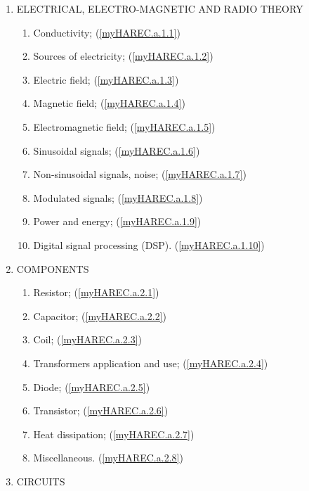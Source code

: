 \renewcommand{\labelenumi}{\theenumi.}
\renewcommand{\theenumii}{\arabic{enumii}}
\renewcommand{\labelenumii}{\theenumi.\theenumii}
\begin{enumerate}
\item ELECTRICAL, ELECTRO-MAGNETIC AND RADIO THEORY
\begin{enumerate}[noitemsep]
\item Conductivity; (\ref{myHAREC.a.1.1})\label{HAREC.a.1.1}
\item Sources of electricity; (\ref{myHAREC.a.1.2})\label{HAREC.a.1.2}
\item Electric field; (\ref{myHAREC.a.1.3})\label{HAREC.a.1.3}
\item Magnetic field; (\ref{myHAREC.a.1.4})\label{HAREC.a.1.4}
\item Electromagnetic field; (\ref{myHAREC.a.1.5})\label{HAREC.a.1.5}
\item Sinusoidal signals; (\ref{myHAREC.a.1.6})\label{HAREC.a.1.6}
\item Non-sinusoidal signals, noise; (\ref{myHAREC.a.1.7})\label{HAREC.a.1.7}
\item Modulated signals; (\ref{myHAREC.a.1.8})\label{HAREC.a.1.8}
\item Power and energy; (\ref{myHAREC.a.1.9})\label{HAREC.a.1.9}
\item Digital signal processing (DSP). (\ref{myHAREC.a.1.10})\label{HAREC.a.1.10}
\end{enumerate}
\item COMPONENTS
\begin{enumerate}[noitemsep]
\item Resistor; (\ref{myHAREC.a.2.1})\label{HAREC.a.2.1}
\item Capacitor; (\ref{myHAREC.a.2.2})\label{HAREC.a.2.2}
\item Coil; (\ref{myHAREC.a.2.3})\label{HAREC.a.2.3}
\item Transformers application and use; (\ref{myHAREC.a.2.4})\label{HAREC.a.2.4}
\item Diode; (\ref{myHAREC.a.2.5})\label{HAREC.a.2.5}
\item Transistor; (\ref{myHAREC.a.2.6})\label{HAREC.a.2.6}
\item Heat dissipation; (\ref{myHAREC.a.2.7})\label{HAREC.a.2.7}
\item Miscellaneous. (\ref{myHAREC.a.2.8})\label{HAREC.a.2.8}
\end{enumerate}
\item CIRCUITS
\begin{enumerate}[noitemsep]

\end{enumerate}
\end{enumerate}
